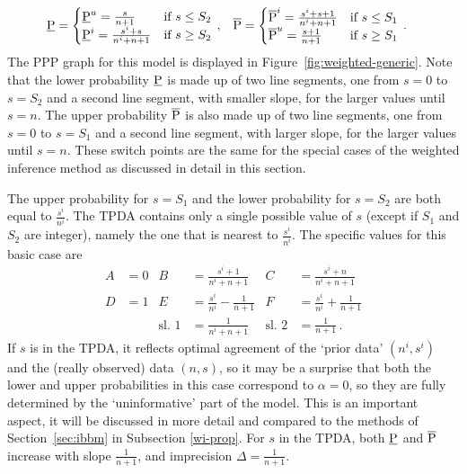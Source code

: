 \begin{align*}
\underline{\operatorname{P}} &=
  \begin{cases}
    \underline{\operatorname{P}}^u = \frac{s}{n+1}           & \text{if } s \leq S_2  \\
    \underline{\operatorname{P}}^i = \frac{s^i+s}{n^i+n+1}   & \text{if } s \geq S_2 
  \end{cases}\,, & 
\overline{\operatorname{P}} &=
  \begin{cases}
    \overline{\operatorname{P}}^i = \frac{s^i+s+1}{n^i+n+1} & \text{if } s \leq S_1  \\
    \overline{\operatorname{P}}^u = \frac{s+1}{n+1}         & \text{if } s \geq S_1 
  \end{cases} \,.
\end{align*}
The PPP graph for this model is displayed %
in Figure~\ref{fig:weighted-generic}.
Note that the lower probability
$\underline{\operatorname{P}}$ is made up of two line segments, one from $s=0$ to $s=S_2$ and
a second line segment, with smaller slope, for the larger values
until $s=n$. The upper probability $\overline{\operatorname{P}}$ is also made up of two line
segments, one from $s=0$ to $s=S_1$ and a second line segment, with
larger slope, for the larger values until $s=n$. These switch points
are the same for the special cases of the weighted inference method
as discussed in detail in this section.

The upper probability for $s=S_1$ and the lower probability for
$s=S_2$ are both equal to $\frac{s^i}{n^i}$. The TPDA
contains only a single possible value of $s$ (except if $S_1$ and $S_2$ are
integer), namely the one that is nearest to $\frac{s^i}{n^i}$. The specific
values for this basic case are %
\begin{align*}
A &= 0 &
B &= \frac{s^i+1}{n^i+n+1} &
C &= \frac{s^i+n}{n^i+n+1} \\
D &= 1 &
E &= \frac{s^i}{n^i}-\frac{1}{n+1} &
F &= \frac{s^i}{n^i}+\frac{1}{n+1} \\
& &
\text{sl.~1} &= \frac{1}{n^i+n+1} &
\text{sl.~2} &= \frac{1}{n+1}\,.
\end{align*}
If $s$ is in the TPDA, it reflects optimal
agreement of the `prior data' $(n^i,s^i)$ and the (really
observed) data $(n,s)$, so it may be a surprise that both the
lower and upper probabilities in this case correspond to $\alpha=0$,
so they are fully determined by the `uninformative' part of the
model. This is an important aspect, it will be discussed in more
detail and compared to the methods of Section~\ref{sec:ibbm} in
Subsection \ref{wi-prop}. For $s$ in the TPDA, both
$\underline{\operatorname{P}}$ and $\overline{\operatorname{P}}$ increase with slope $\frac{1}{n+1}$, and imprecision $\Delta = \frac{1}{n+1}$.

